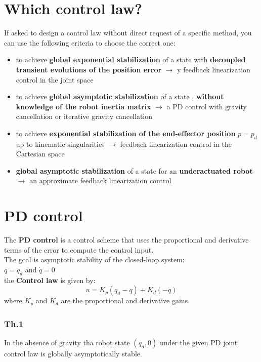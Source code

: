 \documentclass[a4paper,12pt]{article}
\begin{document}
\section{Which control law?}
If asked to design a control law without direct request of a specific method, you can use the following criteria
to choose the correct one:
\begin{itemize}
\item to achieve \textbf{global exponential stabilization} of 
a state with \textbf{decoupled transient evolutions
 of the position error} $\rightarrow$ y feedback linearization control in the joint space
 \item to achieve \textbf{global asymptotic stabilization} of a state
 , \textbf{without knowledge of the robot
 inertia matrix} $\rightarrow$ a PD control with gravity
 cancellation or iterative gravity cancellation
 \item to achieve \textbf{exponential stabilization of the end-effector
  position} $p=p_d$ up
 to kinematic singularities $\rightarrow$ feedback linearization
  control in the Cartesian space
  \item \textbf{global asymptotic stabilization} of a state for an 
  \textbf{underactuated robot} $\rightarrow$ an approximate
   feedback linearization control
\end{itemize}
\section{PD control}
The \textbf{PD control} is a control scheme that uses the
proportional and derivative terms of the error to compute the
control input.\\
The goal is asymptotic stability of the closed-loop system:\\
$q=q_d$ and $\dot{q}=0$\\
the \textbf{Control law} is given by:
\begin{equation}
    u = K_p(q_d-q) + K_d(-\dot{q})
\end{equation}
where $K_p$ and $K_d$ are the proportional and derivative gains.\\
\subsubsection{Th.1}
In the absence of gravity tha robot state $(q_d,0)$ under the given 
PD joint control law is globally asymptotically stable.
\end{document}
